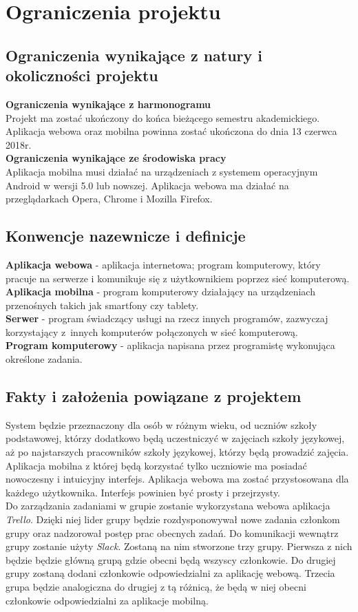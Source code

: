 \documentclass[12pt]{article}
\begin{document}
\clearpage
\section{Ograniczenia projektu}
\subsection{Ograniczenia wynikające z natury i okoliczności projektu}
\textbf{Ograniczenia wynikające z harmonogramu}\\
Projekt ma zostać ukończony do końca bieżącego semestru akademickiego. Aplikacja webowa oraz mobilna powinna zostać ukończona do dnia 13 czerwca 2018r.\\

\noindent\textbf{Ograniczenia wynikające ze środowiska pracy}\\
Aplikacja mobilna musi działać na urządzeniach z systemem operacyjnym Android w wersji 5.0 lub nowszej. Aplikacja webowa ma działać na przeglądarkach Opera, Chrome i Mozilla Firefox.
\subsection{Konwencje nazewnicze i definicje}
\textbf{Aplikacja webowa} - aplikacja internetowa; program komputerowy, który pracuje na serwerze i komunikuje się z użytkownikiem poprzez sieć komputerową.\\[0.3cm]
\textbf{Aplikacja mobilna} - program komputerowy działający na urządzeniach przenośnych takich jak smartfony czy tablety.\\[0.3cm]
\textbf{Serwer} - program świadczący usługi na rzecz innych programów, zazwyczaj korzystający z~innych komputerów połączonych w sieć komputerową.\\[0.3cm]
\textbf{Program komputerowy} - aplikacja napisana przez programistę wykonująca określone zadania.
\subsection{Fakty i założenia powiązane z projektem}
System będzie przeznaczony dla osób w różnym wieku, od uczniów szkoły podstawowej, którzy dodatkowo będą uczestniczyć w zajęciach szkoły językowej, aż po najstarszych pracowników szkoły językowej, którzy będą prowadzić zajęcia. Aplikacja mobilna z której będą korzystać tylko uczniowie ma posiadać nowoczesny i intuicyjny interfejs. Aplikacja webowa ma zostać przystosowana dla każdego użytkownika. Interfejs powinien być prosty i przejrzysty. \\[0.5cm]
Do zarządzania zadaniami w grupie zostanie wykorzystana webowa aplikacja \textit{Trello}. Dzięki niej lider grupy będzie rozdysponowywał nowe zadania członkom grupy oraz nadzorował postęp prac obecnych zadań. Do komunikacji wewnątrz grupy zostanie użyty \textit{Slack}. Zostaną na nim stworzone trzy grupy. Pierwsza z nich będzie będzie główną grupą gdzie obecni będą wszyscy członkowie. Do drugiej grupy zostaną dodani członkowie odpowiedzialni za aplikację webową. Trzecia grupa będzie analogiczna do drugiej z tą różnicą, że będą w niej obecni członkowie odpowiedzialni za aplikacje mobilną.
\end{document}
